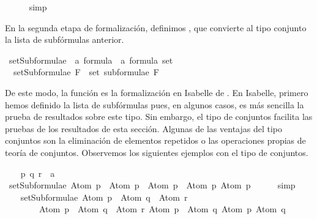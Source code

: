 \begin{isabellebody}
\ \ \ \ \isamarkupfalse%
\ simp%
\endisatagproof
{\isafoldproof}%
%
\isadelimproof
\isanewline
%
\endisadelimproof
{}\isamarkupfalse%
%
\begin{isamarkuptext}%
En la segunda etapa de formalización, definimos 
  , que convierte al tipo conjunto la lista de 
  subfórmulas anterior.%
\end{isamarkuptext}\isamarkuptrue%
\isamarkupfalse%
\ setSubformulae\ {\isacharcolon}{\isacharcolon}\ {\isachardoublequoteopen}{\isacharprime}a\ formula\ {\isasymRightarrow}\ {\isacharprime}a\ formula\ set{\isachardoublequoteclose}\ \isanewline
\ \ {\isachardoublequoteopen}setSubformulae\ F\ {\isasymequiv}\ set\ {\isacharparenleft}subformulae\ F{\isacharparenright}{\isachardoublequoteclose}%
\begin{isamarkuptext}%
De este modo, la función  es la formalización
  en Isabelle de . En Isabelle, primero hemos definido la lista 
  de subfórmulas pues, en algunos casos, es más sencilla la prueba de 
  resultados sobre este tipo. Sin embargo, el tipo de conjuntos facilita
  las pruebas de los resultados de esta sección. Algunas de las
  ventajas del tipo conjuntos son la eliminación de elementos repetidos 
  o las operaciones propias de teoría de conjuntos. Observemos los 
  siguientes ejemplos con el tipo de conjuntos.%
\end{isamarkuptext}\isamarkuptrue%
\isamarkupfalse%
\isanewline
{}\isanewline
%
\isadelimproof
\ \ %
\endisadelimproof
%
\isatagproof
{}\isamarkupfalse%
\ p\ q\ r\ {\isacharcolon}{\isacharcolon}\ {\isacharprime}a\isanewline
\isanewline
\ \ \isamarkupfalse%
\ {\isachardoublequoteopen}setSubformulae\ {\isacharparenleft}Atom\ p\ \isactrlbold {\isasymor}\ Atom\ p{\isacharparenright}\ {\isacharequal}\ {\isacharbraceleft}Atom\ p\ \isactrlbold {\isasymor}\ Atom\ p{\isacharcomma}\ Atom\ p{\isacharbraceright}{\isachardoublequoteclose}\isanewline
\ \ \ \ \isamarkupfalse%
\ simp\isanewline
\ \ \isanewline
\ \ \isamarkupfalse%
\ {\isachardoublequoteopen}setSubformulae\ {\isacharparenleft}{\isacharparenleft}Atom\ p\ \isactrlbold {\isasymrightarrow}\ Atom\ q{\isacharparenright}\ \isactrlbold {\isasymor}\ Atom\ r{\isacharparenright}\ {\isacharequal}\isanewline
\ \ \ \ \ \ \ \ {\isacharbraceleft}{\isacharparenleft}Atom\ p\ \isactrlbold {\isasymrightarrow}\ Atom\ q{\isacharparenright}\ \isactrlbold {\isasymor}\ Atom\ r{\isacharcomma}\ Atom\ p\ \isactrlbold {\isasymrightarrow}\ Atom\ q{\isacharcomma}\ Atom\ p{\isacharcomma}\ Atom\ q{\isacharcomma}\ \isanewline

\end{isabellebody}

